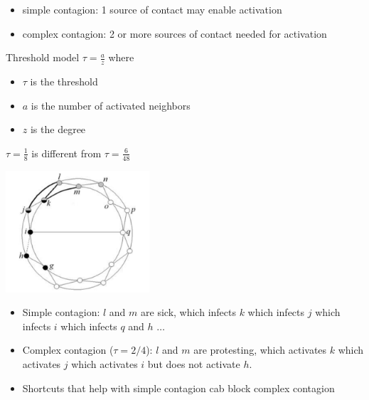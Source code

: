 \documentclass[aspectratio=169]{beamer}
\begin{document}
\begin{frame}

\begin{itemize}
\item simple contagion: 1 source of contact may enable activation 
\pause
\item complex contagion: 2 or more sources of contact needed for activation 
\end{itemize}

\end{frame}
\begin{frame}

Threshold model 
$\tau = \frac{a}{z}$
where
\begin{itemize}
\item $\tau$ is the threshold
\item $a$ is the number of activated neighbors
\item $z$ is the degree
\end{itemize}

\vfill
$\tau = \frac{1}{8}$ is different from $\tau = \frac{6}{48}$
\end{frame}
\begin{frame}

\begin{center}
\includegraphics[width=0.4\textwidth]{figures/centola_complex_2007_fig1}
\end{center}

\begin{itemize}
\item Simple contagion: $l$ and $m$ are sick, \pause which infects $k$ \pause which infects $j$ \pause which infects $i$ \pause which infects $q$ and $h$ $\ldots$ \pause
\item Complex contagion ($\tau = 2/4$): $l$ and $m$ are protesting, \pause which activates $k$ \pause which activates $j$ \pause which activates $i$ \pause but does not activate $h$. \pause
\item Shortcuts that help with simple contagion cab block complex contagion
\end{itemize}

\end{frame}
\end{document}
